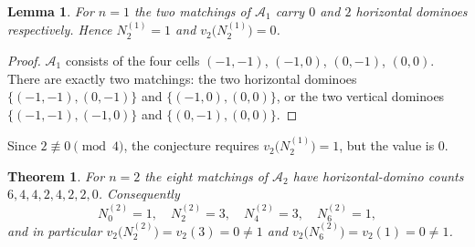 \documentclass[11pt]{article}
\newtheorem{theorem}{Theorem}
\newtheorem{lemma}{Lemma}
\begin{document}
\begin{lemma}
For $n = 1$ the two matchings of $\mathcal{A}_1$ carry $0$ and $2$ horizontal
dominoes respectively.  Hence $N_2^{(1)} = 1$ and $v_2\bigl(N_2^{(1)}\bigr) = 0$.
\end{lemma}

\begin{proof}
$\mathcal{A}_1$ consists of the four cells $(-1,-1)$, $(-1,0)$, $(0,-1)$,
$(0,0)$.  There are exactly two matchings: the two horizontal dominoes
$\{(-1,-1),(0,-1)\}$ and $\{(-1,0),(0,0)\}$, or the two vertical dominoes
$\{(-1,-1),(-1,0)\}$ and $\{(0,-1),(0,0)\}$.
\end{proof}

Since $2 \not\equiv 0 \pmod 4$, the conjecture requires
$v_2\bigl(N_2^{(1)}\bigr) = 1$, but the value is $0$.

\begin{theorem}
For $n = 2$ the eight matchings of $\mathcal{A}_2$ have horizontal-domino
counts $6, 4, 4, 2, 4, 2, 2, 0$.  Consequently
\[
  N_0^{(2)} = 1, \quad N_2^{(2)} = 3, \quad N_4^{(2)} = 3, \quad N_6^{(2)} = 1,
\]
and in particular $v_2\bigl(N_2^{(2)}\bigr) = v_2(3) = 0 \ne 1$ and
$v_2\bigl(N_6^{(2)}\bigr) = v_2(1) = 0 \ne 1$.
\end{theorem}
\end{document}
